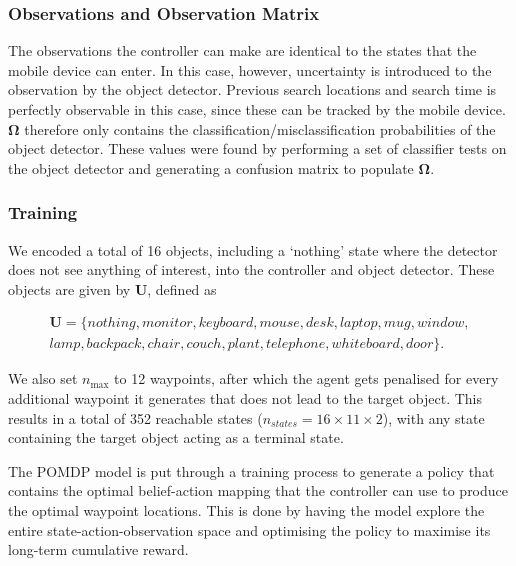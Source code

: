 \documentclass[runningheads]{llncs}
\begin{document}
\subsubsection{Observations and Observation Matrix}

The observations the controller can make are identical to the states that the mobile device can enter. 
In this case, however, uncertainty is introduced to the observation by the object detector.
Previous search locations and search time is perfectly observable in this case, since these can be tracked by the mobile device.
$\mathbf{\Omega}$ therefore only contains the classification/misclassification probabilities of the object detector. 
These values were found by performing a set of classifier tests on the object detector and generating a confusion matrix to populate $\mathbf{\Omega}$.

\subsubsection{Training}

We encoded a total of 16 objects, including a `nothing' state where the detector does not see anything of interest, into the controller and object detector.
These objects are given by $\mathbf{U}$, defined as 

\begin{equation}
  \begin{split}
    \mathbf{U} = \{ nothing, monitor, keyboard, mouse, desk, laptop, mug, window,\\ 
      lamp, backpack, chair, couch, plant, telephone, whiteboard, door \}.
  \end{split}
\end{equation}

We also set $n_{\max}$ to 12 waypoints, after which the agent gets penalised for every additional waypoint it generates that does not lead to the target object. 
This results in a total of 352 reachable states ($n_{states} = 16\times11\times2$), with any state containing the target object acting as a terminal state.

The POMDP model is put through a training process to generate a policy that contains the optimal belief-action mapping that the controller can use to produce the optimal waypoint locations.
This is done by having the model explore the entire state-action-observation space and optimising the policy to maximise its long-term cumulative reward.
\end{document}

